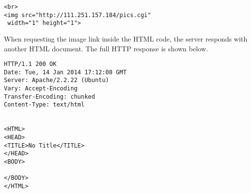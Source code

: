 \documentclass[letterpaper,twocolumn,10pt]{article}
\begin{document}
\begin{lstlisting}
<br>
<img src="http://111.251.157.184/pics.cgi"
 width="1" height="1">
\end{lstlisting}

When requesting the image link inside the HTML code, the server responds with another HTML document.
The full HTTP response is shown below.

\begin{lstlisting}
HTTP/1.1 200 OK
Date: Tue, 14 Jan 2014 17:12:08 GMT
Server: Apache/2.2.22 (Ubuntu)
Vary: Accept-Encoding
Transfer-Encoding: chunked
Content-Type: text/html


<HTML>
<HEAD>
<TITLE>No Title</TITLE>
</HEAD>
<BODY>

</BODY>
</HTML>
\end{lstlisting}
\end{document}
